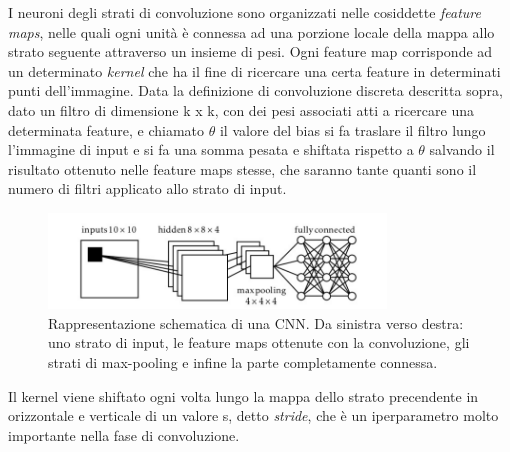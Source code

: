  I neuroni degli strati
  di convoluzione sono organizzati nelle cosiddette \emph{feature maps},
   nelle quali ogni unità è connessa ad una porzione locale della mappa allo strato 
   seguente attraverso un insieme di pesi. Ogni feature map corrisponde ad un determinato
    \emph{kernel} che ha il fine di ricercare una certa feature in determinati punti dell’immagine.  
Data la definizione di convoluzione discreta descritta sopra,
 dato un filtro di dimensione k x k, con dei pesi associati atti a ricercare una determinata feature,
  e chiamato \(\theta\) il valore del bias si fa traslare il filtro lungo l’immagine 
  di input e si fa una somma pesata e shiftata rispetto a \(\theta\) salvando il risultato 
  ottenuto nelle feature maps stesse, che
   saranno tante quanti sono il numero di filtri applicato allo strato di input.
         
   \begin{figure}[H]
     \centering
     \includegraphics[width=0.8\textwidth]{Figures/cnn-schema.PNG}
     \caption{\small{Rappresentazione schematica di una CNN. Da sinistra verso destra: uno strato di input,
     le feature maps ottenute con la convoluzione, gli strati di max-pooling e infine la parte completamente connessa.~\cite{reti} %
     }
     } %
     \label{fi:dcalc}
   \end{figure}
   
Il kernel viene shiftato ogni volta lungo la mappa dello strato precendente in orizzontale e  verticale
 di un valore s, detto \emph{stride}, che è un iperparametro molto importante nella
  fase di convoluzione.

